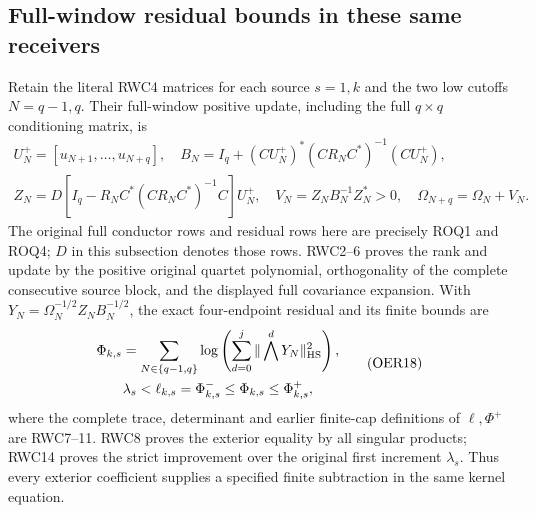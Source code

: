 \documentclass[11pt,a4paper]{article}
\begin{document}
\subsection{Full-window residual bounds in these same receivers}
Retain the literal RWC4 matrices for each source $s=1,k$ and
the two low cutoffs $N=q-1,q$. Their full-window positive update,
including the full $q\times q$ conditioning matrix, is
\[
\begin{gathered}
 U_N^+=[u_{N+1},\ldots,u_{N+q}],\quad
 B_N=I_q+(CU_N^+)^*(CR_NC^*)^{-1}(CU_N^+),\\
 Z_N=D[I_q-R_NC^*(CR_NC^*)^{-1}C]U_N^+,\quad
 V_N=Z_NB_N^{-1}Z_N^*>0,\quad
 \Omega_{N+q}=\Omega_N+V_N .
\end{gathered}\tag{OER17}
\]
The original full conductor rows and residual rows here are precisely
ROQ1 and ROQ4; $D$ in this subsection denotes those rows.
RWC2--6 proves the rank and update by the positive original quartet
polynomial, orthogonality of the complete consecutive source block,
and the displayed full covariance expansion. With
$Y_N=\Omega_N^{-1/2}Z_NB_N^{-1/2}$, the exact four-endpoint
residual and its finite bounds are
\[
\begin{gathered}
 \Phi_{k,s}=\sum_{N\in\{q-1,q\}}
 \log\left(\sum_{d=0}^j\|\bigwedge^dY_N\|_{\rm HS}^2\right),\\
 \lambda_s<\ell_{k,s}=\Phi^-_{k,s}\le\Phi_{k,s}
 \le\Phi^+_{k,s},
\end{gathered}\tag{OER18}
\]
where the complete trace, determinant and earlier finite-cap
definitions of $\ell,\Phi^+$ are RWC7--11. RWC8 proves the
exterior equality by all singular products; RWC14 proves the
strict improvement over the original first increment $\lambda_s$.
Thus every exterior coefficient supplies a specified finite
subtraction in the same kernel equation.
\end{document}
